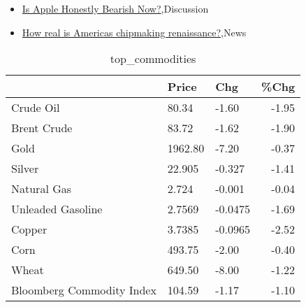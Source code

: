 \documentclass{article}%
\begin{document}
%
\begin{itemize}%
\item%
\href{https://reddit.com/r/StockMarket/comments/15l4s1o/is\_apple\_honestly\_bearish\_now/}{Is Apple Honestly Bearish Now?},Discussion%
\item%
\href{https://reddit.com/r/Economics/comments/15kyd6d/how\_real\_is\_americas\_chipmaking\_renaissance/}{How real is Americas chipmaking renaissance?},News%
\end{itemize}%


\begin{table}[htbp]%
\caption{top\_commodities}%
\centering%
\begin{adjustbox}{width=1\textwidth}%
\begin{tabular}{lllr}
\toprule
                          &   Price &     Chg &  \%Chg \\
\midrule
               Crude Oil  &   80.34 &   -1.60 & -1.95 \\
             Brent Crude  &   83.72 &   -1.62 & -1.90 \\
                    Gold  & 1962.80 &   -7.20 & -0.37 \\
                  Silver  &  22.905 &  -0.327 & -1.41 \\
             Natural Gas  &   2.724 &  -0.001 & -0.04 \\
       Unleaded Gasoline  &  2.7569 & -0.0475 & -1.69 \\
                  Copper  &  3.7385 & -0.0965 & -2.52 \\
                    Corn  &  493.75 &   -2.00 & -0.40 \\
                   Wheat  &  649.50 &   -8.00 & -1.22 \\
Bloomberg Commodity Index &  104.59 &   -1.17 & -1.10 \\
\bottomrule
\end{tabular}
%
\end{adjustbox}%
\end{table}

%
\end{document}
